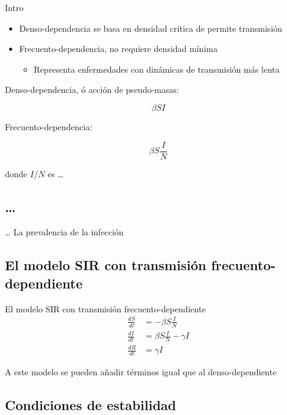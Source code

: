 \documentclass[
  11pt,
  ignorenonframetext,
]{beamer}
\providecommand{\tightlist}{%
  \setlength{\itemsep}{0pt}\setlength{\parskip}{0pt}}
\begin{document}
\begin{frame}{Intro}
\begin{itemize}
\item
  Denso-dependencia se basa en densidad crítica de permite transmisión
\item
  Frecuento-dependencia, no requiere densidad mínima

  \begin{itemize}
  \tightlist
  \item
    Representa enfermedades con dinámicas de transmisión más lenta
  \end{itemize}
\end{itemize}

Denso-dependencia, ó acción de pseudo-masas:

\[\beta SI\]

Frecuento-dependencia:

\[\beta S \frac{I}{N}\]

donde \(I/N\) es \ldots{}
\end{frame}

\hypertarget{section}{%
\subsection{\ldots{}}\label{section}}

\begin{frame}{\ldots{}}
La prevalencia de la infección
\end{frame}

\hypertarget{el-modelo-sir-con-transmisiuxf3n-frecuento-dependiente}{%
\subsection{El modelo SIR con transmisión
frecuento-dependiente}\label{el-modelo-sir-con-transmisiuxf3n-frecuento-dependiente}}

\begin{frame}{El modelo SIR con transmisión frecuento-dependiente}
\begin{align}
\frac{dS}{dt} &= - \beta S \frac{I}{N} \\
\frac{dI}{dt} &= \beta S \frac{I}{N} - \gamma I \\
\frac{dR}{dt} &= \gamma I
\end{align}

A este modelo se pueden añadir términos igual que al denso-dependiente
\end{frame}

\hypertarget{condiciones-de-estabilidad}{%
\subsection{Condiciones de
estabilidad}\label{condiciones-de-estabilidad}}
\end{document}
